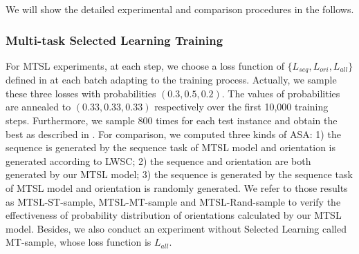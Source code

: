 We will show the detailed experimental and comparison procedures in the follows.


\subsubsection{Multi-task Selected Learning Training}

For MTSL experiments, at each step, we choose a loss function of $\{L_{seq}, L_{ori}, L_{all}\}$ defined in  at each batch adapting to the training process. Actually, we sample these three losses with probabilities $(0.3, 0.5, 0.2)$. The values of probabilities are annealed to $(0.33, 0.33, 0.33)$ respectively over the first 10,000 training steps. Furthermore, we sample 800 times for each test instance and obtain the best as described in . 
For comparison, we computed three kinds of ASA: 1) the sequence is generated by the sequence task of MTSL model and orientation is generated according to LWSC; 2) the sequence and orientation are both generated by our MTSL model; 3) the sequence is generated by the sequence task of MTSL model and orientation is randomly generated. We refer to those results as MTSL-ST-sample, MTSL-MT-sample and MTSL-Rand-sample to verify the effectiveness of probability distribution of orientations calculated by our MTSL model. Besides, we also conduct an experiment without Selected Learning called MT-sample, whose loss function is $L_{all}$.

